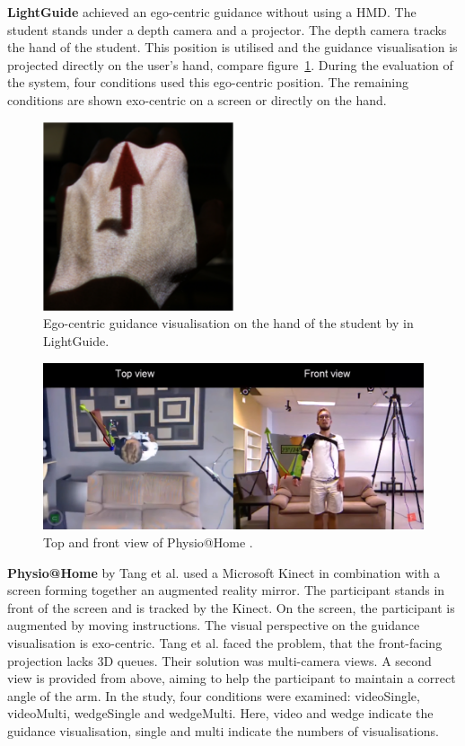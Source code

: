 \textbf{LightGuide} \cite{Sodhi2012} achieved an ego-centric guidance without using a HMD. The student stands under a depth camera and a projector. The depth camera tracks the hand of the student. This position is utilised and the guidance visualisation is projected directly on the user's hand, compare figure~\ref{fig:lightguidepersp}. During the evaluation of the system, four conditions used this ego-centric position. The remaining conditions are shown exo-centric on a screen or directly on the hand.
\begin{figure}
	\centering
	\includegraphics[width=0.5\textwidth]{img/LightGuide_Persp.png}
	\caption{Ego-centric guidance visualisation on the hand of the student by \cite{Sodhi2012} in LightGuide.}
	\label{fig:lightguidepersp}
\end{figure}
\begin{figure}[h]
	\centering
	\includegraphics[width=1.0\textwidth]{img/physioPersp.png}
	\caption{Top and front view of Physio@Home \cite{Tang2015}.}
	\label{fig:physio_persp}
\end{figure}
\textbf{Physio@Home} by Tang et al. \cite{Tang2015} used a Microsoft Kinect in combination with a screen forming together an augmented reality mirror. The participant stands in front of the screen and is tracked by the Kinect. On the screen, the participant is augmented by moving instructions. The visual perspective on the guidance visualisation is exo-centric. Tang et al. faced the problem, that the front-facing projection lacks 3D queues. Their solution was multi-camera views. A second view is provided from above, aiming to help the participant to maintain a correct angle of the arm. In the study, four conditions were examined: videoSingle, videoMulti, wedgeSingle and wedgeMulti. Here, video and wedge indicate the guidance visualisation, single and multi indicate the numbers of visualisations.

